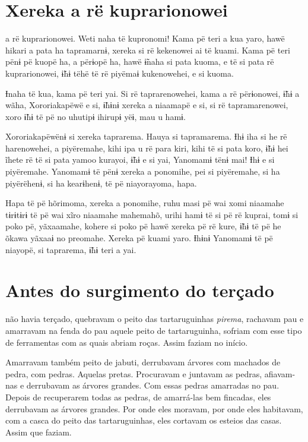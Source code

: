 \chapter{Xereka a rë kuprarionowei}
 
 a rë kuprarionowei. Weti naha të kupronomi! Kama pë teri a kua
yaro, hawë hikari a pata ha tapramarnɨ, xereka si rë kekenowei ai të
kuami. Kama pë teri pënɨ pë kuopë ha, a përɨopë ha, hawë ɨ̃naha si pata
kuoma, e të si pata rë kuprarionowei, ɨ̃hɨ tëhë të rë
piyëmaɨ kukenowehei, e si kuoma. 

Ɨnaha të kua, kama pë teri yai. Si rë taprarenowehei, kama a rë
përɨonowei, ɨ̃hɨ a wãha, Xororiakapëwë e si, ɨ̃hɨnɨ xereka a niaamapë e
si, si rë tapramarenowei, xoro ɨ̃hɨ të pë no uhutipɨ ihirupɨ yëɨ, mau u
hamɨ. 

Xororiakapëwënɨ si xereka taprarema. Hauya si tapramarema. Ɨhɨ iha si he
rë harenowehei, a piyëremahe, kihi ipa u rë para kiri, kihi të si pata
koro, ɨ̃hɨ hei ĩhete rë të si pata yamoo kurayoi, ɨ̃hɨ e si yai,
Yanomamɨ tënɨ mai! Ɨhɨ e si piyëremahe. Yanomamɨ të pënɨ xereka a
ponomihe, pei si piyëremahe, si ha piyërëhenɨ, si ha kearɨhenɨ, të pë
niayorayoma, hapa. 

Hapa të pë hõrimoma, xereka a ponomihe, ruhu masi pë wai xomi niaamahe
tɨrɨtɨrɨ të pë wai xĩro niaamahe mahemahõ, urihi hamɨ të si pë rë
kuprai, tomɨ si poko pë, yãxaamahe, kohere si poko pë hawë xereka pë rë
kure, ɨ̃hɨ të pë he õkawa yãxaaɨ no preomahe. Xereka pë kuami yaro.
Ɨhɨnɨ Yanomamɨ të pë niayopë, si taprarema, ɨ̃hɨ teri a yai.

\chapter{Antes do surgimento do terçado}
 
 não havia terçado, quebravam o peito das
tartaruguinhas \textit{pirema}, rachavam pau e amarravam na fenda do pau
aquele peito de tartaruguinha, sofriam com esse tipo de ferramentas com
as quais abriam roças. Assim faziam no início.

Amarravam também peito de jabuti, derrubavam árvores com machados de
pedra, com pedras. Aquelas pretas. Procuravam e juntavam as pedras,
afiavam-nas e derrubavam as árvores grandes. Com essas pedras amarradas
no pau. Depois de recuperarem todas as pedras, de amarrá-las bem
fincadas, eles derrubavam as árvores grandes. Por onde eles moravam, por
onde eles habitavam, com a casca do peito das tartaruguinhas, eles
cortavam os esteios das casas. Assim que faziam.

